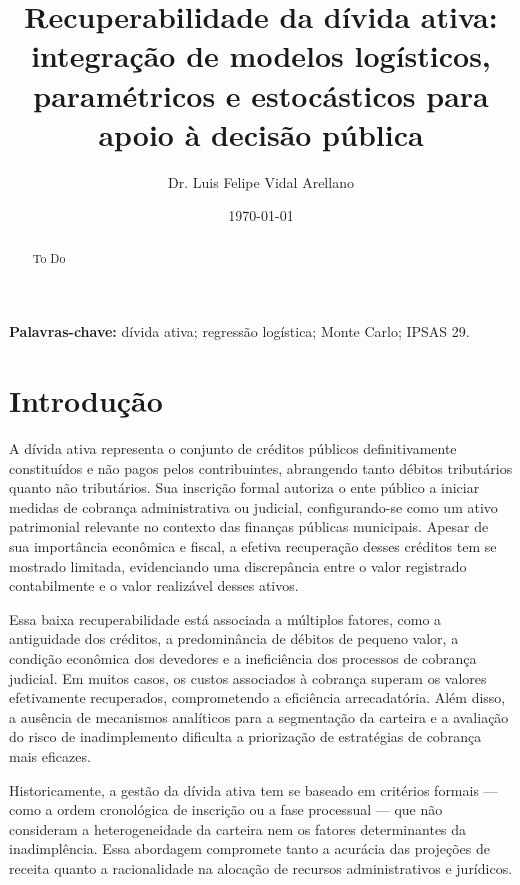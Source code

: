 \documentclass[a4paper,12pt]{article}
\begin{document}
\title{Recuperabilidade da dívida ativa: integração de modelos logísticos, paramétricos e estocásticos para apoio à decisão pública}
\author{Dr. Luis Felipe Vidal Arellano}
\date{\today}
\maketitle

\begin{abstract}
To Do
\end{abstract}

\noindent\textbf{Palavras-chave:} dívida ativa; regressão logística; Monte Carlo; IPSAS 29.

\tableofcontents
\newpage

\section{Introdução}

A dívida ativa representa o conjunto de créditos públicos definitivamente constituídos e não pagos pelos contribuintes, abrangendo tanto débitos tributários quanto não tributários. Sua inscrição formal autoriza o ente público a iniciar medidas de cobrança administrativa ou judicial, configurando-se como um ativo patrimonial relevante no contexto das finanças públicas municipais. Apesar de sua importância econômica e fiscal, a efetiva recuperação desses créditos tem se mostrado limitada, evidenciando uma discrepância entre o valor registrado contabilmente e o valor realizável desses ativos.

Essa baixa recuperabilidade está associada a múltiplos fatores, como a antiguidade dos créditos, a predominância de débitos de pequeno valor, a condição econômica dos devedores e a ineficiência dos processos de cobrança judicial. Em muitos casos, os custos associados à cobrança superam os valores efetivamente recuperados, comprometendo a eficiência arrecadatória. Além disso, a ausência de mecanismos analíticos para a segmentação da carteira e a avaliação do risco de inadimplemento dificulta a priorização de estratégias de cobrança mais eficazes.

Historicamente, a gestão da dívida ativa tem se baseado em critérios formais — como a ordem cronológica de inscrição ou a fase processual — que não consideram a heterogeneidade da carteira nem os fatores determinantes da inadimplência. Essa abordagem compromete tanto a acurácia das projeções de receita quanto a racionalidade na alocação de recursos administrativos e jurídicos.
\end{document}

